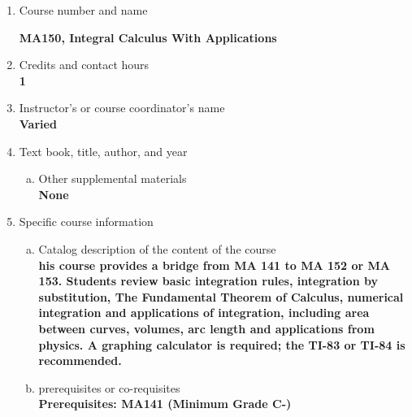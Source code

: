 \label{MA150}  %
\begin{enumerate}[1.]
\item Course number and name\\
  {\bfseries
    MA150, Integral Calculus With Applications

  }
  
\item Credits and contact hours\\
  {\bfseries
    1  %
  }

\item Instructor's or course coordinator's name\\
  {\bfseries
    Varied    
  }

\item Text book, title, author, and year\\
  {\bfseries
    
  }
\begin{enumerate}[a.]
\item Other supplemental materials\\
  {\bfseries
    None    
  }
\end{enumerate}

\item Specific course information
\begin{enumerate}[a.]  
\item Catalog description of the content of the course\\
  {\bfseries
his course provides a bridge from MA 141 to MA 152 or MA 153. Students review basic integration rules, integration by substitution, The Fundamental Theorem of Calculus, numerical integration and applications of integration, including area between curves, volumes, arc length and applications from physics. A graphing calculator is required; the TI-83 or TI-84 is recommended.    
  }

\item prerequisites or co-requisites\\
  {\bfseries
    Prerequisites: MA141 (Minimum Grade C-) \\  %
  }


\end{enumerate}
\end{enumerate}
